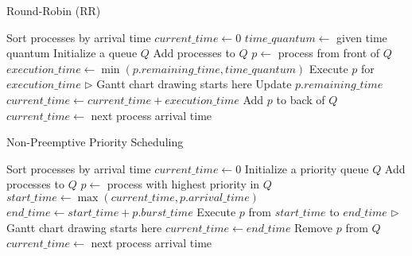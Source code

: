 \documentclass{article}
\begin{document}
\begin{algorithm}
\caption{Round-Robin (RR)}
\begin{algorithmic}[1]
\State Sort processes by arrival time
\State $current\_time \gets 0$
\State $time\_quantum \gets$ given time quantum
\State Initialize a queue $Q$
        \State Add processes to $Q$
    \EndWhile
        \State $p \gets$ process from front of $Q$
        \State $execution\_time \gets \min(p.remaining\_time, time\_quantum)$
        \State Execute $p$ for $execution\_time$ $\triangleright$ Gantt chart drawing starts here
        \State Update $p.remaining\_time$
        \State $current\_time \gets current\_time + execution\_time$
            \State Add $p$ to back of $Q$
        \EndIf
    \Else
        \State $current\_time \gets$ next process arrival time
    \EndIf
\EndWhile
\end{algorithmic}
\end{algorithm}

\begin{algorithm}
\caption{Non-Preemptive Priority Scheduling}
\begin{algorithmic}[1]
\State Sort processes by arrival time
\State $current\_time \gets 0$
\State Initialize a priority queue $Q$
        \State Add processes to $Q$
    \EndWhile
        \State $p \gets$ process with highest priority in $Q$
        \State $start\_time \gets \max(current\_time, p.arrival\_time)$
        \State $end\_time \gets start\_time + p.burst\_time$
        \State Execute $p$ from $start\_time$ to $end\_time$ $\triangleright$ Gantt chart drawing starts here
        \State $current\_time \gets end\_time$
        \State Remove $p$ from $Q$
    \Else
        \State $current\_time \gets$ next process arrival time
    \EndIf
\EndWhile
\end{algorithmic}
\end{algorithm}
\end{document}
